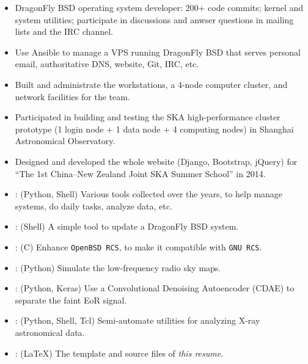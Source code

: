 \documentclass{resume}
\begin{document}
\begin{itemize}
  \item DragonFly BSD operating system developer:
        200+ code commits; kernel and system utilities;
        participate in discussions and anwser questions
        in mailing lists and the IRC channel.
  \item Use Ansible to manage a VPS running DragonFly BSD that serves
        personal email, authoritative DNS, website, Git, IRC, etc.
  \item Built and administrate the workstations, a 4-node computer cluster,
        and network facilities for the team.
  \item Participated in building and testing the SKA high-performance
        cluster prototype (1 login node + 1 data node + 4 computing nodes)
        in Shanghai Astronomical Observatory.
  \item Designed and developed the whole website (Django, Bootstrap, jQuery)
        for \enquote{The 1st China--New Zealand Joint SKA Summer School}
        in 2014.
\end{itemize}

\begin{itemize}
  \item {}:
        (Python, Shell)
        Various tools collected over the years, to help manage systems,
        do daily tasks, analyze data, etc.
  \item {}:
        (Shell)
        A simple tool to update a DragonFly BSD system.
  \item {}:
        (C)
        Enhance \texttt{OpenBSD RCS}, to make it compatible with \texttt{GNU RCS}.
  \item {}:
        (Python)
        Simulate the low-frequency radio sky maps.
  \item {}:
        (Python, Keras)
        Use a Convolutional Denoising Autoencoder (CDAE) to separate the
        faint EoR signal.
  \item {}:
        (Python, Shell, Tcl)
        Semi-automate utilities for analyzing X-ray astronomical data.
  \item {}:
        (\LaTeX)
        The template and source files of \emph{this resume}.
\end{itemize}
\end{document}
